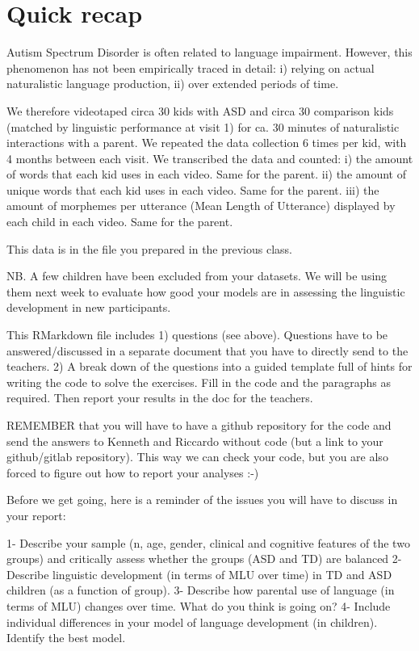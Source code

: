 \documentclass[]{article}
\begin{document}
\section{Quick recap}\label{quick-recap}

Autism Spectrum Disorder is often related to language impairment.
However, this phenomenon has not been empirically traced in detail: i)
relying on actual naturalistic language production, ii) over extended
periods of time.

We therefore videotaped circa 30 kids with ASD and circa 30 comparison
kids (matched by linguistic performance at visit 1) for ca. 30 minutes
of naturalistic interactions with a parent. We repeated the data
collection 6 times per kid, with 4 months between each visit. We
transcribed the data and counted: i) the amount of words that each kid
uses in each video. Same for the parent. ii) the amount of unique words
that each kid uses in each video. Same for the parent. iii) the amount
of morphemes per utterance (Mean Length of Utterance) displayed by each
child in each video. Same for the parent.

This data is in the file you prepared in the previous class.

NB. A few children have been excluded from your datasets. We will be
using them next week to evaluate how good your models are in assessing
the linguistic development in new participants.

This RMarkdown file includes 1) questions (see above). Questions have to
be answered/discussed in a separate document that you have to directly
send to the teachers. 2) A break down of the questions into a guided
template full of hints for writing the code to solve the exercises. Fill
in the code and the paragraphs as required. Then report your results in
the doc for the teachers.

REMEMBER that you will have to have a github repository for the code and
send the answers to Kenneth and Riccardo without code (but a link to
your github/gitlab repository). This way we can check your code, but you
are also forced to figure out how to report your analyses :-)

Before we get going, here is a reminder of the issues you will have to
discuss in your report:

1- Describe your sample (n, age, gender, clinical and cognitive features
of the two groups) and critically assess whether the groups (ASD and TD)
are balanced 2- Describe linguistic development (in terms of MLU over
time) in TD and ASD children (as a function of group). 3- Describe how
parental use of language (in terms of MLU) changes over time. What do
you think is going on? 4- Include individual differences in your model
of language development (in children). Identify the best model.
\end{document}
